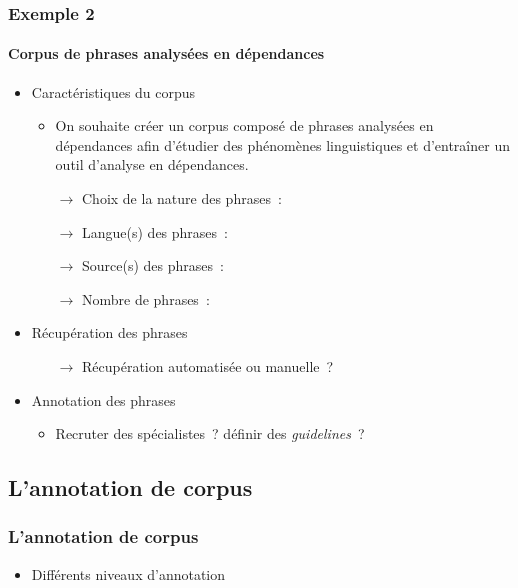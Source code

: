 \begin{frame}
\frametitle{Exemple 2}
\framesubtitle{Corpus de phrases analysées en dépendances}

\begin{itemize} \itemsep10pt
    \item Caractéristiques du corpus
    \begin{itemize}
        \item On souhaite créer un corpus composé de phrases analysées en 
              dépendances afin d'étudier des phénomènes linguistiques
              et d'entraîner un outil d'analyse en dépendances.
        \item[$\to$] Choix de la nature des phrases~: \underline{\qquad}
        \item[$\to$] Langue(s) des phrases~: \underline{\qquad}
        \item[$\to$] Source(s) des phrases~: \underline{\qquad}
        \item[$\to$] Nombre de phrases~: \underline{\qquad}
    \end{itemize}
    \item Récupération des phrases
    \begin{itemize}
        \item[$\to$] Récupération automatisée ou manuelle~?
    \end{itemize}
    \item Annotation des phrases
    \begin{itemize}
        \item Recruter des spécialistes~? définir des \textit{guidelines}~? 
    \end{itemize}

\end{itemize}

\end{frame}


\subsection{L'annotation de corpus}

\begin{frame}
\frametitle{L'annotation de corpus}

\begin{itemize}
    \item Différents niveaux d'annotation
\end{itemize}

\end{frame}



